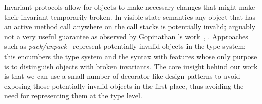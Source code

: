 
Invariant protocols allow for objects to make necessary changes that might make their invariant temporarily broken.
In visible state semantics any object that has an active method call anywhere on the call stacks is potentially invalid;
arguably not a very useful guarantee as observed by
Gopinathan \etal's work~\cite{Gopinathan:2008:RMO:1483018.1483028},
.
Approaches such as \textit{pack/unpack}~\cite{DBLP:journals/jot/BarnettDFLS04} 
represent potentially invalid objects in the type system; this
encumbers the type system and the syntax with features whose only purpose is to distinguish objects with broken invariants. %
The core insight behind our work 
is that we can use a small number of decorator-like design patterns to avoid exposing those potentially invalid objects 
in the first place, thus avoiding the need for representing them at the type level.



